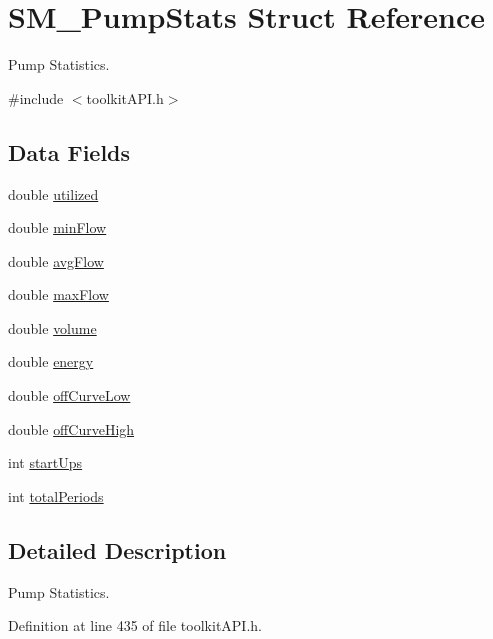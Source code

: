 \hypertarget{struct_s_m___pump_stats}{}\section{S\+M\+\_\+\+Pump\+Stats Struct Reference}
\label{struct_s_m___pump_stats}


Pump Statistics.  




{\ttfamily \#include $<$toolkit\+A\+P\+I.\+h$>$}

\subsection*{Data Fields}
\begin{DoxyCompactItemize}
\item 
double \mbox{\hyperlink{struct_s_m___pump_stats_a200b170f07df6efeaa5aad98ef34a488}{utilized}}
\item 
double \mbox{\hyperlink{struct_s_m___pump_stats_a940e07cc7a1b5085370b23e9846230bb}{min\+Flow}}
\item 
double \mbox{\hyperlink{struct_s_m___pump_stats_afcd256ffd7ec0ed557f6dc62d9b83a52}{avg\+Flow}}
\item 
double \mbox{\hyperlink{struct_s_m___pump_stats_a4d84bca5454f3903c44fe865e44674f5}{max\+Flow}}
\item 
double \mbox{\hyperlink{struct_s_m___pump_stats_a9bc498ccac8db41438f855f5dd3f4c05}{volume}}
\item 
double \mbox{\hyperlink{struct_s_m___pump_stats_ac002779c383d2cc783e881f94449de66}{energy}}
\item 
double \mbox{\hyperlink{struct_s_m___pump_stats_affcf9c914facbda0b5007041aded7f09}{off\+Curve\+Low}}
\item 
double \mbox{\hyperlink{struct_s_m___pump_stats_a54bac8a593e64e581a2347b8ee12f51e}{off\+Curve\+High}}
\item 
int \mbox{\hyperlink{struct_s_m___pump_stats_a7499d03edd943b9f751b6ca6527abca5}{start\+Ups}}
\item 
int \mbox{\hyperlink{struct_s_m___pump_stats_a60fffeca33e0487e4b7cac3898b2cf05}{total\+Periods}}
\end{DoxyCompactItemize}


\subsection{Detailed Description}
Pump Statistics. 

Definition at line 435 of file toolkit\+A\+P\+I.\+h.



